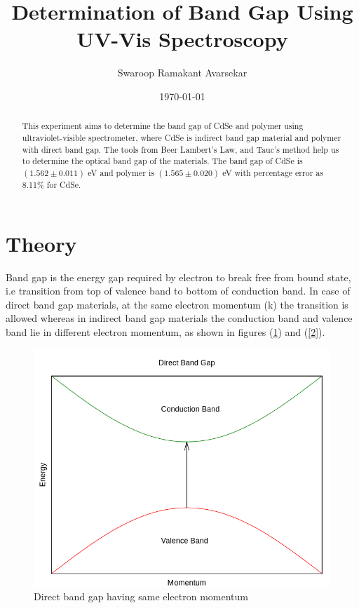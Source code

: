 \documentclass[a4paper, amsfonts, amssymb, amsmath, reprint, showkeys, nofootinbib, twoside]{revtex4-1}
\begin{document}
\title{Determination of Band Gap Using UV-Vis Spectroscopy}
\author{Swaroop Ramakant Avarsekar}
\date{\today}

	
\begin{abstract}
This experiment aims to determine the band gap of CdSe and polymer using ultraviolet-visible spectrometer, where CdSe is indirect band gap material and polymer with direct band gap. The tools from Beer Lambert's Law, and Tauc's method help us to determine the optical band gap of the materials. The band gap of CdSe is $(1.562\pm0.011)$ eV and polymer is $(1.565\pm0.020)$ eV with percentage error as 8.11\% for CdSe.
\end{abstract}
	
	
\maketitle

\section{Theory}
Band gap is the energy gap required by electron to break free from bound state, i.e transition from top of valence band to bottom of conduction band. In case of direct band gap materials, at the same electron momentum (k) the transition is allowed whereas in indirect band gap materials the conduction band and valence band lie in different  electron momentum, as shown in figures (\ref{1}) and (\ref{2}).

\begin{figure}[H]
	\centering
	\includegraphics[scale=0.3]{1}
	\caption{Direct band gap having same electron momentum}
	\label{1}
\end{figure}
\end{document}
